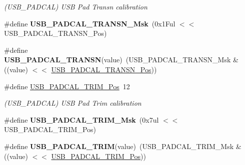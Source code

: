 \begin{DoxyCompactItemize}
\begin{DoxyCompactList}\small\item\em (U\+S\+B\+\_\+\+P\+A\+D\+C\+A\+L) U\+S\+B Pad Transn calibration \end{DoxyCompactList}\item 
\hypertarget{group___s_a_m_l21___u_s_b_gaa0aa6da552d6c485f8b82e68df67abff}{}\#define {\bfseries U\+S\+B\+\_\+\+P\+A\+D\+C\+A\+L\+\_\+\+T\+R\+A\+N\+S\+N\+\_\+\+Msk}~(0x1\+Ful $<$$<$ U\+S\+B\+\_\+\+P\+A\+D\+C\+A\+L\+\_\+\+T\+R\+A\+N\+S\+N\+\_\+\+Pos)\label{group___s_a_m_l21___u_s_b_gaa0aa6da552d6c485f8b82e68df67abff}

\item 
\hypertarget{group___s_a_m_l21___u_s_b_ga834cb9d82fbe981c6c8beb499ea34a1f}{}\#define {\bfseries U\+S\+B\+\_\+\+P\+A\+D\+C\+A\+L\+\_\+\+T\+R\+A\+N\+S\+N}(value)~(U\+S\+B\+\_\+\+P\+A\+D\+C\+A\+L\+\_\+\+T\+R\+A\+N\+S\+N\+\_\+\+Msk \& ((value) $<$$<$ \hyperlink{group___s_a_m_l21___u_s_b_ga754c140a8bdd5eb6cff99bca755b8153}{U\+S\+B\+\_\+\+P\+A\+D\+C\+A\+L\+\_\+\+T\+R\+A\+N\+S\+N\+\_\+\+Pos}))\label{group___s_a_m_l21___u_s_b_ga834cb9d82fbe981c6c8beb499ea34a1f}

\item 
\hypertarget{group___s_a_m_l21___u_s_b_gaf292cae000be883ae59972f8bc45d599}{}\#define \hyperlink{group___s_a_m_l21___u_s_b_gaf292cae000be883ae59972f8bc45d599}{U\+S\+B\+\_\+\+P\+A\+D\+C\+A\+L\+\_\+\+T\+R\+I\+M\+\_\+\+Pos}~12\label{group___s_a_m_l21___u_s_b_gaf292cae000be883ae59972f8bc45d599}

\begin{DoxyCompactList}\small\item\em (U\+S\+B\+\_\+\+P\+A\+D\+C\+A\+L) U\+S\+B Pad Trim calibration \end{DoxyCompactList}\item 
\hypertarget{group___s_a_m_l21___u_s_b_ga7403603747c7778612cd7767ba6d15c4}{}\#define {\bfseries U\+S\+B\+\_\+\+P\+A\+D\+C\+A\+L\+\_\+\+T\+R\+I\+M\+\_\+\+Msk}~(0x7ul $<$$<$ U\+S\+B\+\_\+\+P\+A\+D\+C\+A\+L\+\_\+\+T\+R\+I\+M\+\_\+\+Pos)\label{group___s_a_m_l21___u_s_b_ga7403603747c7778612cd7767ba6d15c4}

\item 
\hypertarget{group___s_a_m_l21___u_s_b_gad1f60aef4d4a0559dfcfbe31e31663f0}{}\#define {\bfseries U\+S\+B\+\_\+\+P\+A\+D\+C\+A\+L\+\_\+\+T\+R\+I\+M}(value)~(U\+S\+B\+\_\+\+P\+A\+D\+C\+A\+L\+\_\+\+T\+R\+I\+M\+\_\+\+Msk \& ((value) $<$$<$ \hyperlink{group___s_a_m_l21___u_s_b_gaf292cae000be883ae59972f8bc45d599}{U\+S\+B\+\_\+\+P\+A\+D\+C\+A\+L\+\_\+\+T\+R\+I\+M\+\_\+\+Pos}))\label{group___s_a_m_l21___u_s_b_gad1f60aef4d4a0559dfcfbe31e31663f0}


\end{DoxyCompactItemize}
